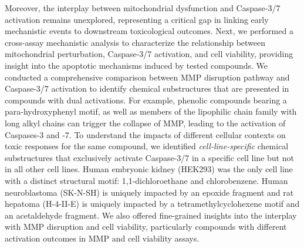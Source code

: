 \documentclass[letterpaper]{article}
\begin{document}
Moreover, the interplay between mitochondrial dysfunction and Caspase-3/7 activation remains unexplored, representing a critical gap in linking early mechanistic events to downstream toxicological outcomes.
Next, we performed a cross-assay mechanistic analysis to characterize the relationship between mitochondrial perturbation, Caspase-3/7 activation, and cell viability, providing insight into the apoptotic mechanisms induced by tested compounds. We conducted a comprehensive comparison between MMP disruption pathway and Caspase-3/7 activation to identify chemical substructures that are presented in compounds with dual activations. For example, phenolic compounds bearing a  para-hydroxyphenyl motif, as well as members of the lipophilic chain family with long alkyl chains can trigger the collapse of MMP, leading to the activation of Caspases-3 and -7. To understand the impacts of different cellular contexts on toxic responses for the same compound, we identified \emph{cell-line-specific} chemical substructures that exclusively activate Caspase-3/7 in a specific cell line but not in all other cell lines. Human embryonic kidney (HEK293) was the only cell line with a distinct structural motif: 1,1-dichloroethane and chlorobenzene. Human neuroblastoma (SK-N-SH) is uniquely impacted by an epoxide fragment and rat hepatoma (H-4-II-E) is uniquely impacted by a tetramethylcyclohexene motif and an acetaldehyde fragment. We also offered fine-grained insights into the interplay with MMP disruption and cell viability, particularly compounds with different activation outcomes in MMP and cell viability assays.








\end{document}
